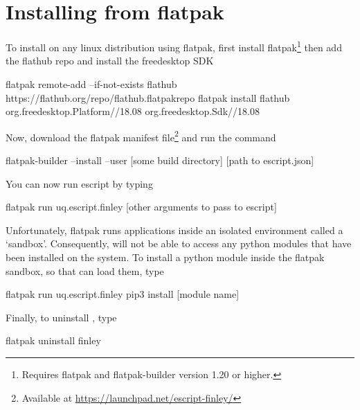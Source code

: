 %
%
%


\chapter{Installing from flatpak}\label{chap:flatpak}

To install \escript on any linux distribution using flatpak, first install flatpak\footnote{Requires flatpak and flatpak-builder version 1.20 or higher.} then add the flathub repo and install the freedesktop SDK

\begin{smallShellCode}
flatpak remote-add --if-not-exists flathub https://flathub.org/repo/flathub.flatpakrepo
flatpak install flathub org.freedesktop.Platform//18.08 org.freedesktop.Sdk//18.08
\end{smallShellCode}

Now, download the flatpak manifest file\footnote{Available at \url{https://launchpad.net/escript-finley/}} and run the command

\begin{smallShellCode}
flatpak-builder --install --user [some build directory] [path to escript.json]
\end{smallShellCode}

You can now run escript by typing

\begin{smallShellCode}
flatpak run uq.escript.finley [other arguments to pass to escript]
\end{smallShellCode}

Unfortunately, flatpak runs applications inside an isolated environment called a `sandbox'. Consequently, \escript will not be able to access any python modules that have been installed on the system. To install a python module inside the flatpak sandbox, so that \escript can load them, type

\begin{smallShellCode}
flatpak run uq.escript.finley pip3 install [module name]
\end{smallShellCode}

Finally, to uninstall \escript, type

\begin{smallShellCode}
flatpak uninstall finley
\end{smallShellCode}
